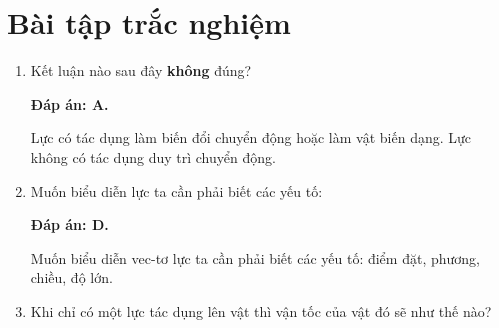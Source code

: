 \let\lesson\undefined
\newcommand{\lesson}{\phantomlesson{Bài 12.}}
\setcounter{section}{0}
\section{Bài tập trắc nghiệm}
\begin{enumerate}[label=\bfseries Câu \arabic*:,leftmargin=1.5cm]
	\item {}
	
	
	{Kết luận nào sau đây \textbf{không} đúng?
	}
	
	\hideall
	{		\textbf{Đáp án: A.}
		
		Lực có tác dụng làm biến đổi chuyển động hoặc làm vật biến dạng. Lực không có tác dụng duy trì chuyển động.
		
	}
	\item {}
	
	
	{Muốn biểu diễn lực ta cần phải biết các yếu tố:
	}
	
	\hideall
	{		\textbf{Đáp án: D.}
		
		Muốn biểu diễn vec-tơ lực ta cần phải biết các yếu tố: điểm đặt, phương, chiều, độ lớn.
		
	}
	\item {}
	
	
	{Khi chỉ có một lực tác dụng lên vật thì vận tốc của vật đó sẽ như thế nào?
	}
	

\end{enumerate}
